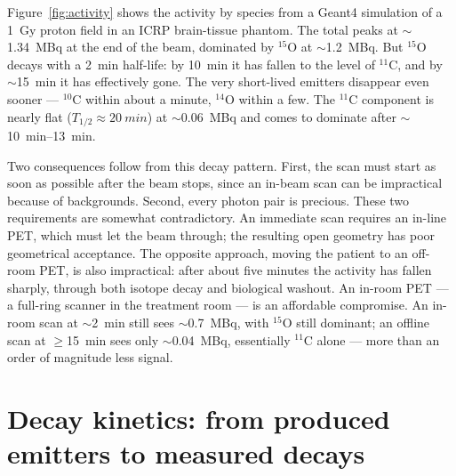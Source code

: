 \documentclass[11pt]{article}
\newcommand{\Cl}[1]{{}^{#1}\mathrm{C}}
\newcommand{\Ox}[1]{{}^{#1}\mathrm{O}}
\begin{document}
Figure~\ref{fig:activity} shows the activity by species from a Geant4 simulation of
a \SI{1}{Gy} proton field in an ICRP brain-tissue phantom.
The total peaks at $\sim$\SI{1.34}{MBq} at the end of the beam, dominated by
$\Ox{15}$ at $\sim$\SI{1.2}{MBq}. But $\Ox{15}$ decays with a \SI{2}{min} half-life:
by \SI{10}{min} it has fallen to the level of $\Cl{11}$, and by $\sim$\SI{15}{min}
it has effectively gone. The very short-lived emitters disappear even sooner ---
$\Cl{10}$ within about a minute, $\Ox{14}$ within a few. The $\Cl{11}$ component is
nearly flat ($T_{1/2}\approx\SI{20}{min}$) at $\sim$\SI{0.06}{MBq} and comes to
dominate after $\sim$\SIrange{10}{13}{min}.

Two consequences follow from this decay pattern. First, the scan must start as soon as possible after the beam stops, since an in-beam scan can be impractical because of backgrounds. Second, every photon pair is precious. These two requirements are somewhat contradictory. An immediate scan requires an in-line PET, which must let the beam through; the resulting open geometry has poor geometrical acceptance. The opposite approach, moving the patient to an off-room PET, is also impractical: after about five minutes the activity has fallen sharply, through both isotope decay and biological washout. An in-room PET --- a full-ring scanner in the treatment room --- is an affordable compromise. An in-room scan at $\sim$\SI{2}{min} still sees $\sim$\SI{0.7}{MBq}, with $\Ox{15}$ still dominant; an offline scan at $\geq$\SI{15}{min} sees only $\sim$\SI{0.04}{MBq}, essentially $\Cl{11}$ alone --- more than an order of magnitude less signal.

\section{Decay kinetics: from produced emitters to measured decays}
\label{sec:kinetics}
\end{document}

